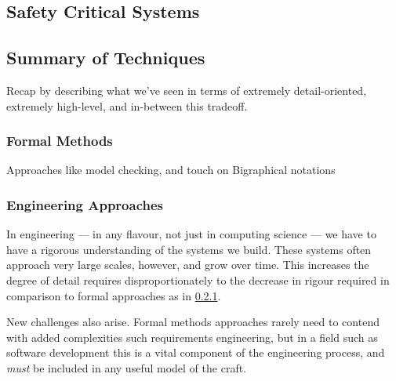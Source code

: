 \subsection{Safety Critical Systems}


\subsection{Summary of Techniques}
Recap by describing what we've seen in terms of extremely detail-oriented, extremely high-level, and in-between this tradeoff.
  
\subsubsection{Formal Methods}\label{sec:review-formal-methods}

Approaches like model checking, and touch on Bigraphical notations
\par

\subsubsection{Engineering Approaches}

In engineering --- in any flavour, not just in computing science --- we have to have a rigorous understanding of the systems we build. 
These systems often approach very large scales, however, and grow over time.
This increases the degree of detail requires disproportionately to the decrease in rigour required in comparison to formal approaches as in \ref{sec:review-formal-methods}.
\par

New challenges also arise. Formal methods approaches rarely need to contend with added complexities such requirements engineering, but in a field such as software development this is a vital component of the engineering process, and \emph{must} be included in any useful model of the craft.
\par


